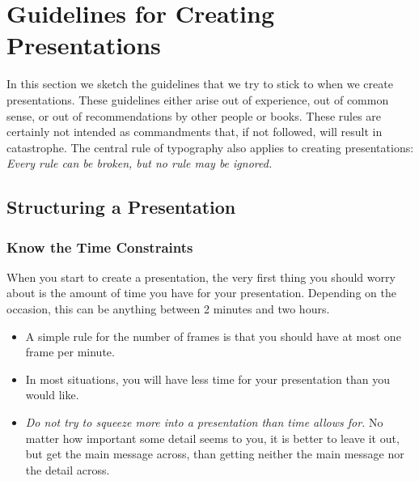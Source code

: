 %
%
%

\section{Guidelines for Creating Presentations}
\label{section-guidelines}

In this section we sketch the guidelines that we try to stick to when we create presentations. These guidelines either arise out of experience, out of common sense, or out of recommendations by other people or books. These rules are certainly not intended as commandments that, if not followed, will result in catastrophe. The central rule of typography also applies to creating presentations: \emph{Every rule can be broken, but no rule may be ignored.}


\subsection{Structuring a Presentation}
\label{section-structure-guidelines}

\subsubsection{Know the Time Constraints}

When you start to create a presentation, the very first thing you should worry about is the amount of time you have for your presentation. Depending on the occasion, this can be anything between 2 minutes and two hours.
\begin{itemize}
\item
  A simple rule for the number of frames is that you should have at most one frame per minute.
\item
  In most situations, you will have less time for your presentation than you would like.
\item
  \emph{Do not try to squeeze more into a presentation than time allows for.} No matter how important some detail seems to you, it is better to leave it out, but get the main message across, than getting neither the main message nor the detail across.
\end{itemize}

